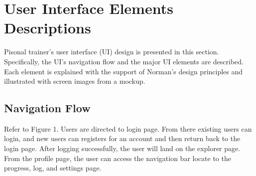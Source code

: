 \documentclass{article}
\begin{document}
\newpage

\clearpage
\setcounter{page}{1}

% 

\section{User Interface Elements Descriptions}
 Pisonal trainer’s user interface (UI) design is presented in this section. Specifically, the UI’s navigation flow and the major UI elements are described. Each element is explained with the support of Norman’s design principles and illustrated with screen images from a mockup.

\subsection{Navigation Flow}
Refer to Figure  1. Users are directed to login page. From there existing users can login, and new users can registers for an account and then return back to the login page. After logging successfully, the user will land on the explorer page. From the profile page, the user can access the navigation bar locate to the progress, log, and settings page. 

\begingroup
\begin{center}
\begin{figure}[h]
\end{figure}
\end{center}
\endgroup
\end{document}
